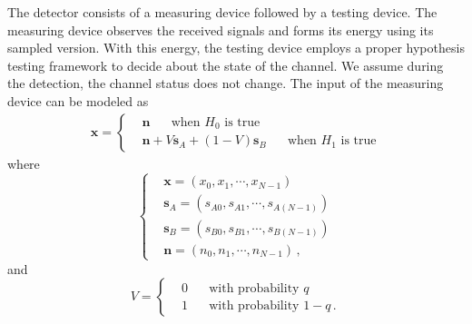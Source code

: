 The detector consists of a measuring device followed by a testing device. The measuring device observes the received signals and forms its energy using its sampled version. With this energy, the testing device employs a proper hypothesis testing framework to decide about the state of the channel. We assume during the detection, the channel status does not change. The input of the measuring device can be modeled as 
\begin{eqnarray}
  \mathbf{x} = \begin{cases}
    &\mathbf{n}\;\;\;\;\;\;\text{when $H_0$ is true}\\
    &\mathbf{n} + V\mathbf{s}_A + (1-V)\mathbf{s}_B\;\;\;\;\;\;\text{when $H_1$ is true}
  \end{cases}
  \label{equ:input2energy}
\end{eqnarray}
where
\begin{equation}
  \begin{cases}
	&\mathbf{x} = (x_0, x_1, \cdots, x_{N-1})\\
	&\mathbf{s}_A = (s_{A0}, s_{A1}, \cdots, s_{A(N-1)})\\
	&\mathbf{s}_B = (s_{B0}, s_{B1}, \cdots, s_{B(N-1)})\\
	&\mathbf{n} = (n_{0}, n_{1}, \cdots, n_{N-1})\,,
  \end{cases}
  \label{150621a1}
\end{equation}
and 
\begin{equation}
  V = \begin{cases}
    &0\;\;\;\;\;\;\text{with probability $q$}\\
    &1\;\;\;\;\;\;\text{with probability $1-q$}\,.
  \end{cases}
  \label{150621a2}
\end{equation}

